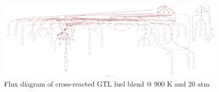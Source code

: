 \thispagestyle{plain}
\justifying

\begin{figure}
    \centering
    \includegraphics[scale=0.1, angle = 90, keepaspectratio]{images/GTL-PFA.png}
    \caption{Flux diagram of cross-reacted GTL fuel blend @ 900 K and 20 atm}
    \label{fig:gtl-pfa}
\end{figure}


